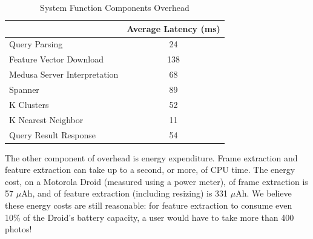 
\begin{table}
  \footnotesize
    \centering
    \begin{tabular}{lc}
    \toprule
     & Average Latency (ms) \\
    \midrule
    Query Parsing & 24 \\
    Feature Vector Download & 138 \\
    Medusa Server Interpretation & 68 \\
    Spanner & 89 \\
    K Clusters & 52 \\
    K Nearest Neighbor & 11 \\
    Query Result Response & 54 \\
    \bottomrule
    \end{tabular}
    \caption{System Function Components Overhead}
    \label{tab:overhead}
\end{table}

%
The other component of overhead is energy expenditure.
%
Frame extraction and feature extraction can take up to a second, or
more, of CPU time.
%
The energy cost, on a Motorola Droid (measured using a power meter),
of frame extraction is 57 $\mu$Ah, and of feature extraction
(including resizing) is 331 $\mu$Ah.
%
We believe these energy costs are still reasonable: for feature
extraction to consume even 10\% of the Droid's battery capacity, a
user would have to take more than 400 photos!
%






